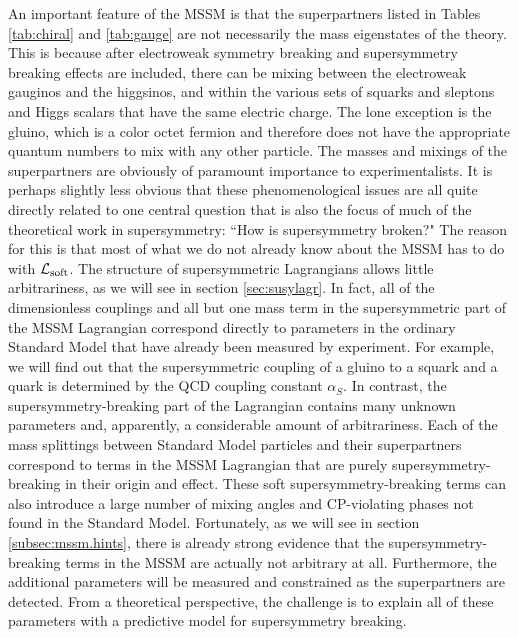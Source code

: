 \documentclass[11pt]{article}
\def\lagr{{\cal L}}
\begin{document}
An important feature of the MSSM is that the superpartners listed in
Tables \ref{tab:chiral} and \ref{tab:gauge} 
are not necessarily the mass eigenstates of the theory.
This is because after electroweak symmetry breaking and supersymmetry
breaking effects are included, there can be mixing between the electroweak
gauginos and the higgsinos, and within the various sets of squarks and
sleptons and Higgs scalars that have the same electric charge. The lone
exception is the gluino, which is a color octet fermion and therefore does
not have the appropriate quantum numbers to mix with any other particle.
The masses and mixings of the superpartners are obviously of paramount
importance to experimentalists. It is perhaps slightly less obvious that
these phenomenological issues are all quite directly related to one
central question that is also the focus of much of the theoretical work in
supersymmetry: ``How is supersymmetry broken?" The reason for this is that
most of what we do not already know about the MSSM has to do with
$\lagr_{\rm soft}$. The structure of supersymmetric Lagrangians allows
little arbitrariness, as we will see in section \ref{sec:susylagr}.
In fact, all of the dimensionless couplings and all but one mass term in
the supersymmetric part of the MSSM Lagrangian correspond directly to
parameters in the ordinary Standard Model that have already been measured
by experiment. For example, we will find out that the supersymmetric
coupling of a gluino to a squark and a quark is determined by the QCD
coupling constant $\alpha_S$. In contrast, the supersymmetry-breaking part
of the Lagrangian contains many unknown parameters and, apparently, a
considerable amount of arbitrariness. Each of the mass splittings between
Standard Model particles and their superpartners correspond to terms in
the MSSM Lagrangian that are purely supersymmetry-breaking in their origin
and effect. These soft supersymmetry-breaking terms can also introduce a
large number of mixing angles and CP-violating phases not found in the
Standard Model. Fortunately, as we will see in section
\ref{subsec:mssm.hints}, there is already strong evidence that the
supersymmetry-breaking terms in the MSSM are actually not arbitrary at
all. Furthermore, the additional parameters will be measured and
constrained as the superpartners are detected. From a theoretical
perspective, the challenge is to explain all of these parameters with a
predictive model for supersymmetry breaking. 
\end{document}
